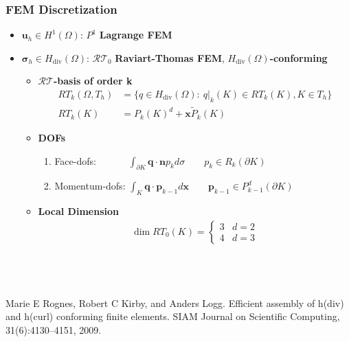 \documentclass[8pt, oneside]{beamer}   	%
\newcommand{\bn}{\textbf{n}}
\newcommand{\bp}{\textbf{p}}
\newcommand{\bq}{\textbf{q}}
\newcommand{\bu}{\textbf{u}}
\newcommand{\bbx}{\textbf{x}}
\newcommand{\bsigma}{\boldsymbol{\sigma}}
\newcommand{\RT}{\mathcal{RT}}
\begin{document}
\begin{frame}
\frametitle{\textbf{FEM Discretization}}
\begin{itemize}
\item $\bu_h \in H^1(\Omega)$: $P^1$ \textbf{Lagrange FEM}
\item $\bsigma_h \in H_{\text{div}}(\Omega)$: $\RT_0$ \textbf{Raviart-Thomas FEM}, \textbf{$H_{\text{div}}(\Omega)$-conforming}
\begin{itemize}
\item  \textbf{$\RT$-basis of order k}
\begin{align*}
RT_k(\Omega,T_h)& =\{q\in H_{\text{div}}(\Omega) : \: q|_k(K) \in RT_k(K), K\in T_h\}\\
RT_k(K) &=P_k(K)^d+  \bbx \tilde{P}_k(K)
\end{align*}
\item \textbf{DOFs}
\begin{enumerate}
\item Face-dofs:          $\qquad \quad \int_{\partial K} \bq \cdot \bn p_k d \sigma \qquad p_k \in R_k(\partial K)$
\item Momentum-dofs: $\int_{ K} \bq \cdot \bp_{k-1} d \bbx \qquad \bp_{k-1} \in P_{k-1}^d(\partial K)$
\end{enumerate}
\item \textbf{Local Dimension}
\begin{align*}
\dim RT_0(K)=\begin{cases}
3&d=2\\
4&d=3
\end{cases}
\end{align*}
\end{itemize}
\end{itemize}
${}$\\
${}$\\
${}$\\
\footnotesize{Marie E Rognes, Robert C Kirby, and Anders Logg. Efficient assembly of h(div) and h(curl) conforming finite elements. SIAM Journal on Scientific Computing, 31(6):4130–4151, 2009.}

\end{frame}

\begin{frame}
\Huge {}
\end{frame}
\end{document}
